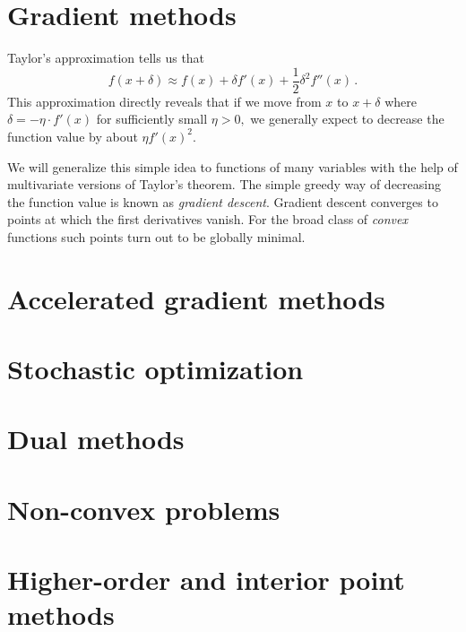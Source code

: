 \documentclass[11pt]{article}
\begin{document}
\maketitle



\pagebreak

\setcounter{tocdepth}{2}
\tableofcontents

\pagebreak

\part{Gradient methods}
\label{part:basic}

Taylor's approximation tells us that
\[
f(x+\delta)\approx f(x) + \delta f'(x) + \frac 12 \delta^2 f''(x)\,.
\]
This approximation directly reveals that if we move from $x$ to $x+\delta$ where
$\delta=-\eta \cdot f'(x)$ for sufficiently small $\eta>0,$ we generally expect
to decrease the function value by about $\eta f'(x)^2.$ 

We will generalize this simple idea to functions of many variables with the help
of multivariate versions of Taylor's theorem. The simple greedy way of
decreasing the function value is known as \emph{gradient descent}. Gradient
descent converges to points at which the first derivatives vanish. For the broad
class of \emph{convex} functions such points turn out to be globally minimal.







\part{Accelerated gradient methods}
\label{part:accelerated}





\part{Stochastic optimization}
\label{part:stochastic}




\part{Dual methods}
\label{part:dual}




\part{Non-convex problems}
\label{part:nonconvex}





\part{Higher-order and interior point methods}
\label{part:higher}







\end{document}

